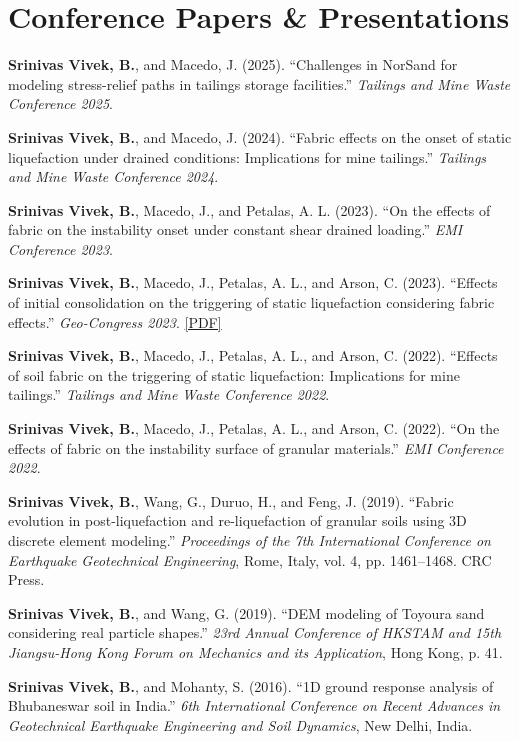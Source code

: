 \documentclass[10pt,letterpaper]{article}
\newcommand{\pub}[2]{%
    \item \hypertarget{pub:#1}{}#2
}
\begin{document}
\section{Conference Papers \& Presentations}
\begin{enumerate}[resume, label={[\arabic*]}, leftmargin=*, itemsep=0pt]

\pub{10}{\textbf{Srinivas Vivek, B.}, and Macedo, J. (2025). ``Challenges in NorSand for modeling stress-relief paths in tailings storage facilities.'' \textit{Tailings and Mine Waste Conference 2025}.}

\pub{11}{\textbf{Srinivas Vivek, B.}, and Macedo, J. (2024). ``Fabric effects on the onset of static liquefaction under drained conditions: Implications for mine tailings.'' \textit{Tailings and Mine Waste Conference 2024}.}

\pub{12}{\textbf{Srinivas Vivek, B.}, Macedo, J., and Petalas, A. L. (2023). ``On the effects of fabric on the instability onset under constant shear drained loading.'' \textit{EMI Conference 2023}.}

\pub{13}{\textbf{Srinivas Vivek, B.}, Macedo, J., Petalas, A. L., and Arson, C. (2023). ``Effects of initial consolidation on the triggering of static liquefaction considering fabric effects.'' \textit{Geo-Congress 2023}. \href{https://ascelibrary.org/doi/epdf/10.1061/9780784484708.008}{[PDF]}}

\pub{14}{\textbf{Srinivas Vivek, B.}, Macedo, J., Petalas, A. L., and Arson, C. (2022). ``Effects of soil fabric on the triggering of static liquefaction: Implications for mine tailings.'' \textit{Tailings and Mine Waste Conference 2022}.}

\pub{15}{\textbf{Srinivas Vivek, B.}, Macedo, J., Petalas, A. L., and Arson, C. (2022). ``On the effects of fabric on the instability surface of granular materials.'' \textit{EMI Conference 2022}.}

\pub{16}{\textbf{Srinivas Vivek, B.}, Wang, G., Duruo, H., and Feng, J. (2019). ``Fabric evolution in post-liquefaction and re-liquefaction of granular soils using 3D discrete element modeling.'' \textit{Proceedings of the 7th International Conference on Earthquake Geotechnical Engineering}, Rome, Italy, vol. 4, pp. 1461--1468. CRC Press.}

\pub{17}{\textbf{Srinivas Vivek, B.}, and Wang, G. (2019). ``DEM modeling of Toyoura sand considering real particle shapes.'' \textit{23rd Annual Conference of HKSTAM and 15th Jiangsu-Hong Kong Forum on Mechanics and its Application}, Hong Kong, p. 41.}

\pub{18}{\textbf{Srinivas Vivek, B.}, and Mohanty, S. (2016). ``1D ground response analysis of Bhubaneswar soil in India.'' \textit{6th International Conference on Recent Advances in Geotechnical Earthquake Engineering and Soil Dynamics}, New Delhi, India.}

\end{enumerate}
\end{document}
